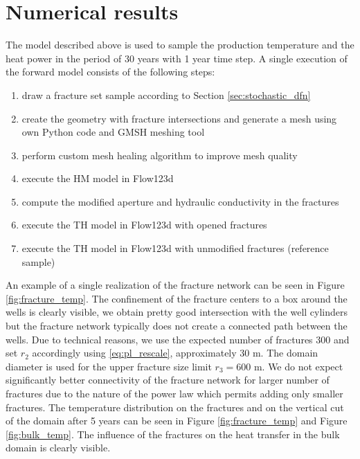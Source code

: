 \documentclass{article}
\begin{document}
\section{Numerical results}
The model described above is used to sample the production temperature and the heat power in the period of 30 years with 1 year time step. A single execution of the forward model consists of the following steps:
\begin{enumerate}
    \item draw a fracture set sample according to Section \ref{sec:stochastic_dfn}
    \item create the geometry with fracture intersections and generate a mesh using own Python code and GMSH meshing tool \cite{GMSH}
    \item perform custom mesh healing algorithm to improve mesh quality
    \item execute the HM model in Flow123d
    \item compute the modified aperture and hydraulic conductivity in the fractures
    \item execute the TH model in Flow123d with opened fractures
    \item execute the TH model in Flow123d with unmodified fractures (reference sample)
\end{enumerate}
An example of a single realization of the fracture network can be seen in Figure \ref{fig:fracture_temp}. The confinement of the fracture centers to a box around the wells is clearly visible, we obtain pretty good intersection with the well cylinders but the fracture network typically does not create a connected path between the wells. Due to technical reasons, we use the expected number of fractures 300 and set $r_2$ accordingly using \eqref{eq:pl_rescale}, approximately 30 m. The domain diameter is used for the upper fracture size limit $r_3=600$ m. We do not expect significantly better connectivity of the fracture network for larger number of fractures due to the nature of the power law which permits adding only smaller fractures. The temperature distribution on the fractures and on the vertical cut of the domain after 5 years can be seen in Figure \ref{fig:fracture_temp} and Figure \ref{fig:bulk_temp}. The influence of the fractures on the heat transfer in the bulk domain is clearly visible.
\end{document}
